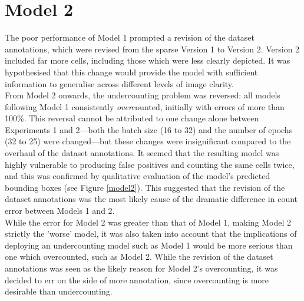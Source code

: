 \section{Model 2}
The poor performance of Model 1 prompted a revision of the dataset annotations, which were revised from the sparse Version 1 to Version 2. Version 2 included far more cells, including those which were less clearly depicted. It was hypothesised that this change would provide the model with sufficient information to generalise across different levels of image clarity.\\

From Model 2 onwards, the undercounting problem was reversed: all models following Model 1 consistently \textit{over}counted, initially with errors of more than 100\%. This reversal cannot be attributed to one change alone between Experiments 1 and 2—both the batch size (16 to 32) and the number of epochs (32 to 25) were changed—but these changes were insignificant compared to the overhaul of the dataset annotations. It seemed that the resulting model was highly vulnerable to producing false positives and counting the same cells twice, and this was confirmed by qualitative evaluation of the model's predicted bounding boxes (see Figure \ref{model2}). This suggested that the revision of the dataset annotations was the most likely cause of the dramatic difference in count error between Models 1 and 2.\\

While the error for Model 2 was greater than that of Model 1, making Model 2 strictly the 'worse' model, it was also taken into account that the implications of deploying an undercounting model such as Model 1 would be more serious than one which overcounted, such as Model 2. While the revision of the dataset annotations was seen as the likely reason for Model 2's overcounting, it was decided to err on the side of more annotation, since overcounting is more desirable than undercounting.

